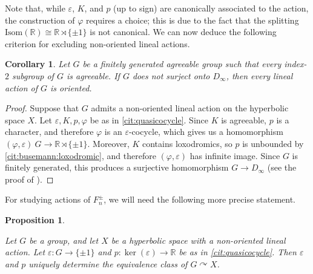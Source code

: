 \documentclass[reqno,12pt]{amsart}\setcounter{tocdepth}{1}
\newtheorem{proposition}[theorem]{Proposition}
\newtheorem{corollary}[theorem]{Corollary}
\theoremstyle{definition}
\newcommand{\R}{\mathbb{R}}
\numberwithin{equation}{section}
\begin{document}
Note that, while $\varepsilon$, $K$, and $p$ (up to sign) are canonically associated to the action, the construction of $\varphi$ requires a choice; this is due to the fact that the splitting $\mathrm{Isom}(\R) \cong \R \rtimes \{ \pm 1 \}$ is not canonical. We can now deduce the following criterion for excluding non-oriented lineal actions.

\begin{corollary}\label{cor:nonoriented}
Let $G$ be a finitely generated agreeable group such that every index-$2$ subgroup of $G$ is agreeable. If $G$ does not surject onto $D_\infty$, then every lineal action of $G$ is oriented.
\end{corollary}

\begin{proof}
Suppose that $G$ admits a non-oriented lineal action on the hyperbolic space $X$. Let $\varepsilon, K, p, \varphi$ be as in \cref{cit:quasicocycle}. Since $K$ is agreeable, $p$ is a character, and therefore $\varphi$ is an $\varepsilon$-cocycle, which gives us a homomorphism $(\varphi, \varepsilon) \ G \to \R \rtimes \{ \pm 1 \}$. Moreover, $K$ contains loxodromics, so $p$ is unbounded by \cref{cit:busemann:loxodromic}, and therefore $(\varphi, \varepsilon)$ has infinite image. Since $G$ is finitely generated, this produces a surjective homomorphism $G \to D_\infty$ (see the proof of \cite[Proposition 3.1]{NL}).
\end{proof}

For studying actions of $F_n^{\pm}$, we will need the following more precise statement.

\begin{proposition}
\label{prop:nonoriented:classification}

Let $G$ be a group, and let $X$ be a hyperbolic space with a non-oriented lineal action. Let $\varepsilon \colon G \to \{ \pm 1 \}$ and $p \colon \ker(\varepsilon) \to \R$ be as in \cref{cit:quasicocycle}. Then $\varepsilon$ and $p$ uniquely determine the equivalence class of $G \curvearrowright X$.
\end{proposition}
\end{document}

